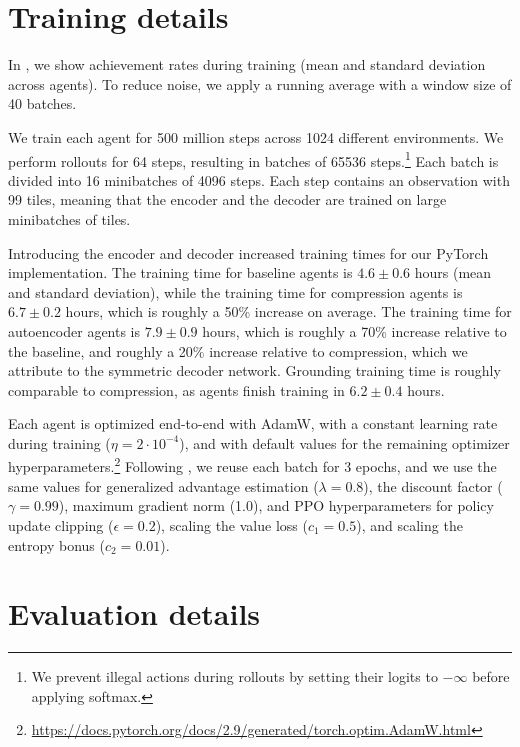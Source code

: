 \documentclass[final]{nesy2026}
\begin{document}
\section{Training details}\label{apd:training_details}

In , we show achievement rates during training (mean and standard deviation across agents). To reduce noise, we apply a running average with a window size of 40 batches.

We train each agent for 500 million steps across 1024 different environments.
We perform rollouts for 64 steps, resulting in batches of 65536 steps.\footnote{We prevent illegal actions during rollouts by setting their logits to $-\infty$ before applying softmax.}
Each batch is divided into 16 minibatches of 4096 steps.
Each step contains an observation with 99 tiles, meaning that the encoder and the decoder are trained on large minibatches of tiles.

Introducing the encoder and decoder increased training times for our PyTorch implementation. The training time for baseline agents is $4.6 \pm 0.6$ hours (mean and standard deviation), while the training time for compression agents is $6.7 \pm 0.2$ hours, which is roughly a 50\% increase on average. The training time for autoencoder agents is $7.9 \pm 0.9$ hours, which is roughly a 70\% increase relative to the baseline, and roughly a 20\% increase relative to compression, which we attribute to the symmetric decoder network. Grounding training time is roughly comparable to compression, as agents finish training in $6.2 \pm 0.4$ hours.

Each agent is optimized end-to-end with AdamW, with a constant learning rate during training ($\eta = 2\cdot10^{-4}$), and with default values for the remaining optimizer hyperparameters.\footnote{\url{https://docs.pytorch.org/docs/2.9/generated/torch.optim.AdamW.html}}
Following \cite{matthews2024}, we reuse each batch for 3 epochs, and we use the same values for generalized advantage estimation ($\lambda = 0.8$), the discount factor ($\gamma = 0.99$), maximum gradient norm (1.0), and PPO hyperparameters for policy update clipping ($\epsilon = 0.2$), scaling the value loss ($c_1 = 0.5$), and scaling the entropy bonus ($c_2 = 0.01$).

\section{Evaluation details}\label{apd:eval}
\end{document}
